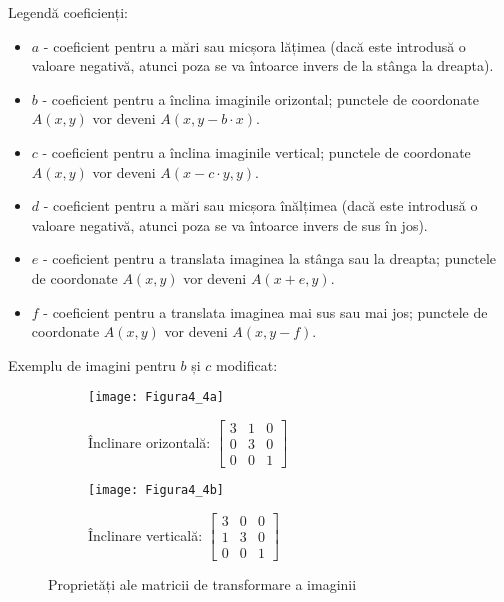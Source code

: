 \noindent
Legendă coeficienți:
\begin{itemize}
	\item \(a\) - coeficient pentru a mări sau micșora lățimea (dacă este introdusă o valoare negativă, atunci poza se va întoarce invers de la stânga la dreapta).
	\item \(b\) - coeficient pentru a înclina imaginile orizontal; punctele de coordonate $A(x, y)$ vor deveni $A(x, y-b \cdot x)$.
	\item \(c\) - coeficient pentru a înclina imaginile vertical; punctele de coordonate $A(x, y)$ vor deveni $A(x - c \cdot y, y)$.
	\item \(d\) - coeficient pentru a mări sau micșora înălțimea (dacă este introdusă o valoare negativă, atunci poza se va întoarce invers de sus în jos).
	\item \(e\) - coeficient pentru a translata imaginea la stânga sau la dreapta; punctele de coordonate $A(x, y)$ vor deveni $A(x + e, y)$.
	\item \(f\) - coeficient pentru a translata imaginea mai sus sau mai jos; punctele de coordonate $A(x, y)$ vor deveni $A(x, y-f)$.
\end{itemize}

Exemplu de imagini pentru $b$ și $c$  modificat:
\begin{figure}[H]
	\centering
	\begin{subfigure}[t]{.5\textwidth}
		\centering
		\texttt{[image: Figura4\_4a]}
		\caption{Înclinare orizontală:
			$
			\begin{bmatrix}
				3 & 1 & 0\\
				0 & 3 & 0\\
				0 & 0 & 1
			\end{bmatrix}
			$}
		\label{fig:Figura4_4a}
	\end{subfigure}%
	\begin{subfigure}[t]{.5\textwidth}
		\centering
		\texttt{[image: Figura4\_4b]}
		\caption{Înclinare verticală:
			$
			\begin{bmatrix}
				3 & 0 & 0\\
				1 & 3 & 0\\
				0 & 0 & 1
			\end{bmatrix}
			$}
		\label{fig:Figura4_4b}
	\end{subfigure}
	\caption{Proprietăți ale matricii de transformare a imaginii}
	\label{fig:Figura4_4}
\end{figure}

